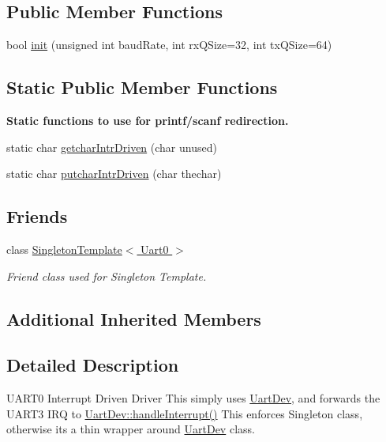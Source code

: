 \subsection*{Public Member Functions}
\begin{DoxyCompactItemize}
\item 
bool \hyperlink{classUart0_a44d70c9c2a804062b9ba9fdd046c60b6}{init} (unsigned int baud\+Rate, int rx\+Q\+Size=32, int tx\+Q\+Size=64)
\end{DoxyCompactItemize}
\subsection*{Static Public Member Functions}
\begin{Indent}{\bf Static functions to use for printf/scanf redirection.}\par
\begin{DoxyCompactItemize}
\item 
static char \hyperlink{classUart0_ad68e3f89b795da45f8af664f41552f40}{getchar\+Intr\+Driven} (char unused)
\item 
static char \hyperlink{classUart0_a1e8478f57546a54c1d484c8edde037c9}{putchar\+Intr\+Driven} (char thechar)
\end{DoxyCompactItemize}
\end{Indent}
\subsection*{Friends}
\begin{DoxyCompactItemize}
\item 
class \hyperlink{classUart0_a1f6324854a84273f74610dbff733e94f}{Singleton\+Template$<$ Uart0 $>$}
\begin{DoxyCompactList}\small\item\em Friend class used for Singleton Template. \end{DoxyCompactList}\end{DoxyCompactItemize}
\subsection*{Additional Inherited Members}


\subsection{Detailed Description}
U\+A\+R\+T0 Interrupt Driven Driver This simply uses \hyperlink{classUartDev}{Uart\+Dev}, and forwards the U\+A\+R\+T3 I\+RQ to \hyperlink{classUartDev_a88db44755fb545c2553cabf95a338db4}{Uart\+Dev\+::handle\+Interrupt()} This enforces Singleton class, otherwise it\textquotesingle{}s a thin wrapper around \hyperlink{classUartDev}{Uart\+Dev} class. 

